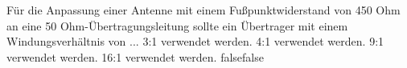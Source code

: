     {Für die Anpassung einer Antenne mit einem Fußpunktwiderstand von 450 Ohm an eine 50 Ohm-Übertragungsleitung sollte ein Übertrager mit einem Windungsverhältnis von ...}
    {3:1 verwendet werden.}
    {4:1 verwendet werden.}
    {9:1 verwendet werden.}
    {16:1 verwendet werden.}
    {false}{false}
